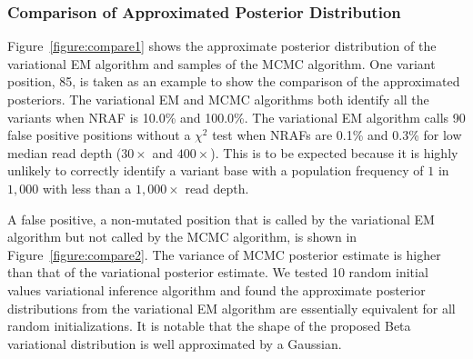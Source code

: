 \documentclass{bmcart}
\begin{document}
\subsubsection*{Comparison of Approximated Posterior Distribution}

Figure~\ref{figure:compare1} shows the approximate posterior distribution of the variational EM algorithm and samples of the MCMC algorithm.
One variant position, 85, is taken as an example to show the comparison of the approximated posteriors.
The variational EM and MCMC algorithms both identify all the variants when NRAF is 10.0\% and 100.0\%.
The variational EM algorithm calls 90 false positive positions without a $\chi^2$ test when NRAFs are 0.1\% and 0.3\% for low median read depth ($30\times$ and $400\times$).
This is to be expected because it is highly unlikely to correctly identify a variant base with a population frequency of $1$ in $1,000$ with less than a $1,000\times$ read depth.

A false positive, a non-mutated position that is called by the variational EM algorithm but not called by the MCMC algorithm, is shown in Figure~\ref{figure:compare2}.
The variance of MCMC posterior estimate is higher than that of the variational posterior estimate.
We tested 10 random initial values variational inference algorithm and found the approximate posterior distributions from the variational EM algorithm are essentially equivalent for all random initializations.
It is notable that the shape of the proposed Beta variational distribution is well approximated by a Gaussian.
\end{document}
